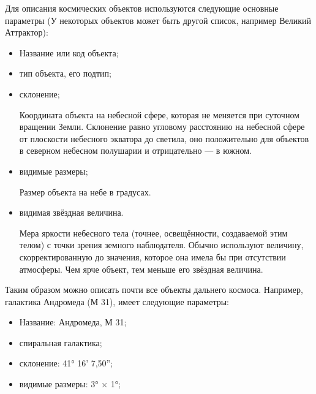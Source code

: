 \documentclass[14pt]{extreport}
\begin{document}
{\begin{itemize}
        \end{itemize}

        Для описания космических объектов используются следующие основные параметры (У некоторых объектов может быть другой список, например Великий Аттрактор):

        \begin{itemize}
            \item Название или код объекта;
        
            \item тип объекта, его подтип;
            
            \item склонение;
            
            Координата объекта на небесной сфере, которая не меняется при суточном вращении Земли. Склонение равно угловому расстоянию на небесной сфере от плоскости небесного экватора до светила, оно положительно для объектов в северном небесном полушарии и отрицательно — в южном.   
            
            \item видимые размеры;

            Размер объекта на небе в градусах.
            
            \item видимая звёздная величина.

            Мера яркости небесного тела (точнее, освещённости, создаваемой этим телом) с точки зрения земного наблюдателя. Обычно используют величину, скорректированную до значения, которое она имела бы при отсутствии атмосферы. Чем ярче объект, тем меньше его звёздная величина.
        \end{itemize}

        Таким образом можно описать почти все объекты дальнего космоса. Например, галактика Андромеда (М 31), имеет следующие параметры:

        \begin{itemize}
        
            \item Название: Андромеда, М 31;

            \item спиральная галактика;
            
            \item склонение: 41° 16' 7,50'';
            
            \item видимые размеры: 3° × 1°;
            

\end{itemize}}
\end{document}
